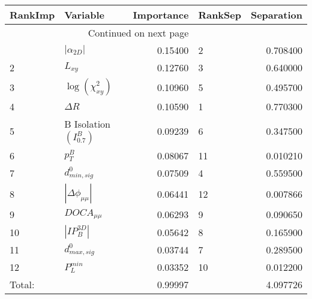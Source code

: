 \begin{longtable}{llrlr}
\toprule
RankImp &                     Variable &  Importance & RankSep &  Separation \\
\midrule
\endhead
\midrule
\multicolumn{3}{r}{{Continued on next page}} \\
\midrule
\endfoot

\bottomrule
\endlastfoot
      1 &              $|\alpha_{2D}|$ &     0.15400 &       2 &    0.708400 \\
      2 &                     $L_{xy}$ &     0.12760 &       3 &    0.640000 \\
      3 &      $\log{(\chi^{2}_{xy})}$ &     0.10960 &       5 &    0.495700 \\
      4 &                   $\Delta R$ &     0.10590 &       1 &    0.770300 \\
      5 &  B Isolation $(I^{B}_{0.7})$ &     0.09239 &       6 &    0.347500 \\
      6 &                    $p^B_{T}$ &     0.08067 &      11 &    0.010210 \\
      7 &             $d^0_{min, sig}$ &     0.07509 &       4 &    0.559500 \\
      8 &     $|\Delta \phi_{\mu\mu}|$ &     0.06441 &      12 &    0.007866 \\
      9 &              $DOCA_{\mu\mu}$ &     0.06293 &       9 &    0.090650 \\
     10 &              $|IP_{B}^{3D}|$ &     0.05642 &       8 &    0.165900 \\
     11 &             $d^0_{max, sig}$ &     0.03744 &       7 &    0.289500 \\
     12 &                $P^{min}_{L}$ &     0.03352 &      10 &    0.012200 \\
 Total: &                              &     0.99997 &         &    4.097726 \\
\end{longtable}
